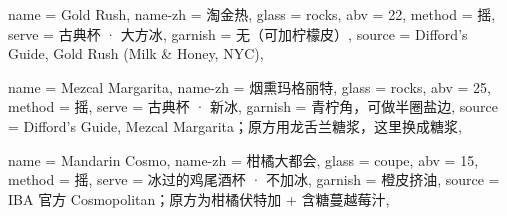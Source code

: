 \documentclass{cocktailcheatsheet}
\begin{document}
\newpage

\noindent
\begin{recipe}[half=r1]{
  name = Gold Rush, name-zh = 淘金热, glass = rocks, abv = 22,
  method = 摇, serve = {古典杯 · 大方冰}, garnish = {无（可加柠檬皮）},
  source = {Difford’s Guide, Gold Rush (Milk \& Honey, NYC)},
}
\begin{ingredients}
\end{ingredients}
\end{recipe}\hfill
\begin{recipe}[half=r1]{
  name = Mezcal Margarita, name-zh = 烟熏玛格丽特, glass = rocks, abv = 25,
  method = 摇, serve = {古典杯 · 新冰}, garnish = {青柠角，可做半圈盐边},
  source = {Difford’s Guide, Mezcal Margarita；原方用龙舌兰糖浆，这里换成糖浆},
}
\begin{ingredients}
\end{ingredients}
\end{recipe}\rowgap
\noindent
\begin{recipe}[half=r2]{
  name = Mandarin Cosmo, name-zh = 柑橘大都会, glass = coupe, abv = 15,
  method = 摇, serve = {冰过的鸡尾酒杯 · 不加冰}, garnish = 橙皮挤油,
  source = {IBA 官方 Cosmopolitan；原方为柑橘伏特加 + 含糖蔓越莓汁},
}
\begin{ingredients}
\end{ingredients}
\end{recipe}\hfill
\end{document}
